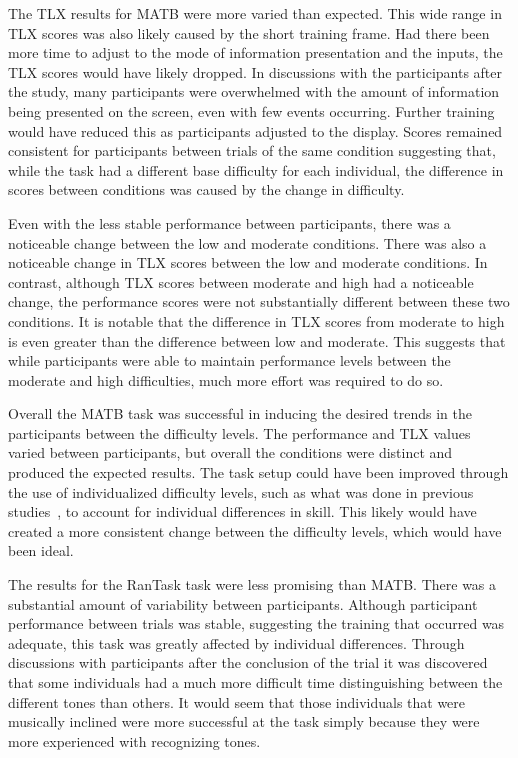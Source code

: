 \documentclass[11pt]{article}
\begin{document}
	The TLX results for MATB were more varied than expected. This wide range in TLX scores was also likely caused by the short training frame. Had there been more time to adjust to the mode of information presentation and the inputs, the TLX scores would have likely dropped. In discussions with the participants after the study, many participants were overwhelmed with the amount of information being presented on the screen, even with few events occurring. Further training would have reduced this as participants adjusted to the display. Scores remained consistent for participants between trials of the same condition suggesting that, while the task had a different base difficulty for each individual, the difference in scores between conditions was caused by the change in difficulty.
	
	Even with the less stable performance between participants, there was a noticeable change between the low and moderate conditions. There was also a noticeable change in TLX scores between the low and moderate conditions. In contrast, although TLX scores between moderate and high had a noticeable change, the performance scores were not substantially different between these two conditions. It is notable that the difference in TLX scores from moderate to high is even greater than the difference between low and moderate. This suggests that while participants were able to maintain performance levels between the moderate and high difficulties, much more effort was required to do so. 
	
	Overall the MATB task was successful in inducing the desired trends in the participants between the difficulty levels. The performance and TLX values varied between participants, but overall the conditions were distinct and produced the expected results. The task setup could have been improved through the use of individualized difficulty levels, such as what was done in previous studies~\cite{Estepp_2015}, to account for individual differences in skill. This likely would have created a more consistent change between the difficulty levels, which would have been ideal.
	
	The results for the RanTask task were less promising than MATB. There was a substantial amount of variability between participants. Although participant performance between trials was stable, suggesting the training that occurred was adequate, this task was greatly affected by individual differences. Through discussions with participants after the conclusion of the trial it was discovered that some individuals had a much more difficult time distinguishing between the different tones than others. It would seem that those individuals that were musically inclined were more successful at the task simply because they were more experienced with recognizing tones. 
	
\end{document}
